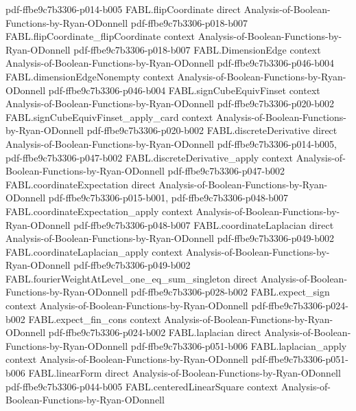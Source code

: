 \begin{theorem}
  {pdf-ffbe9c7b3306-p014-b005}
\proofstep
  {FABL.flipCoordinate}
  {direct}
  {Analysis-of-Boolean-Functions-by-Ryan-ODonnell}
  {pdf-ffbe9c7b3306-p018-b007}
\proofstep
  {FABL.flipCoordinate_flipCoordinate}
  {context}
  {Analysis-of-Boolean-Functions-by-Ryan-ODonnell}
  {pdf-ffbe9c7b3306-p018-b007}
\proofstep
  {FABL.DimensionEdge}
  {context}
  {Analysis-of-Boolean-Functions-by-Ryan-ODonnell}
  {pdf-ffbe9c7b3306-p046-b004}
\proofstep
  {FABL.dimensionEdgeNonempty}
  {context}
  {Analysis-of-Boolean-Functions-by-Ryan-ODonnell}
  {pdf-ffbe9c7b3306-p046-b004}
\proofstep
  {FABL.signCubeEquivFinset}
  {context}
  {Analysis-of-Boolean-Functions-by-Ryan-ODonnell}
  {pdf-ffbe9c7b3306-p020-b002}
\proofstep
  {FABL.signCubeEquivFinset_apply_card}
  {context}
  {Analysis-of-Boolean-Functions-by-Ryan-ODonnell}
  {pdf-ffbe9c7b3306-p020-b002}
\proofstep
  {FABL.discreteDerivative}
  {direct}
  {Analysis-of-Boolean-Functions-by-Ryan-ODonnell}
  {pdf-ffbe9c7b3306-p014-b005,
    pdf-ffbe9c7b3306-p047-b002}
\proofstep
  {FABL.discreteDerivative_apply}
  {context}
  {Analysis-of-Boolean-Functions-by-Ryan-ODonnell}
  {pdf-ffbe9c7b3306-p047-b002}
\proofstep
  {FABL.coordinateExpectation}
  {direct}
  {Analysis-of-Boolean-Functions-by-Ryan-ODonnell}
  {pdf-ffbe9c7b3306-p015-b001,
    pdf-ffbe9c7b3306-p048-b007}
\proofstep
  {FABL.coordinateExpectation_apply}
  {context}
  {Analysis-of-Boolean-Functions-by-Ryan-ODonnell}
  {pdf-ffbe9c7b3306-p048-b007}
\proofstep
  {FABL.coordinateLaplacian}
  {direct}
  {Analysis-of-Boolean-Functions-by-Ryan-ODonnell}
  {pdf-ffbe9c7b3306-p049-b002}
\proofstep
  {FABL.coordinateLaplacian_apply}
  {context}
  {Analysis-of-Boolean-Functions-by-Ryan-ODonnell}
  {pdf-ffbe9c7b3306-p049-b002}
\proofstep
  {FABL.fourierWeightAtLevel_one_eq_sum_singleton}
  {direct}
  {Analysis-of-Boolean-Functions-by-Ryan-ODonnell}
  {pdf-ffbe9c7b3306-p028-b002}
\proofstep
  {FABL.expect_sign}
  {context}
  {Analysis-of-Boolean-Functions-by-Ryan-ODonnell}
  {pdf-ffbe9c7b3306-p024-b002}
\proofstep
  {FABL.expect_fin_cons}
  {context}
  {Analysis-of-Boolean-Functions-by-Ryan-ODonnell}
  {pdf-ffbe9c7b3306-p024-b002}
\proofstep
  {FABL.laplacian}
  {direct}
  {Analysis-of-Boolean-Functions-by-Ryan-ODonnell}
  {pdf-ffbe9c7b3306-p051-b006}
\proofstep
  {FABL.laplacian_apply}
  {context}
  {Analysis-of-Boolean-Functions-by-Ryan-ODonnell}
  {pdf-ffbe9c7b3306-p051-b006}
\proofstep
  {FABL.linearForm}
  {direct}
  {Analysis-of-Boolean-Functions-by-Ryan-ODonnell}
  {pdf-ffbe9c7b3306-p044-b005}
\proofstep
  {FABL.centeredLinearSquare}
  {context}
  {Analysis-of-Boolean-Functions-by-Ryan-ODonnell}

\end{theorem}
